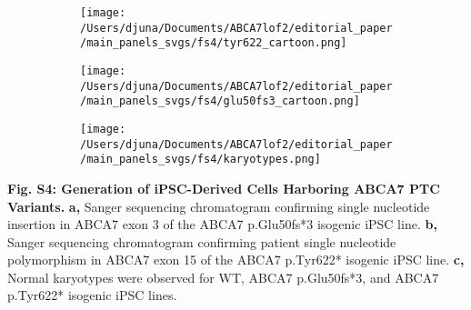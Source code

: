 \documentclass[12pt]{article}
\begin{document}
\begin{figure}[H]
    \begin{subfigure}[t]{0.4\textwidth}
        \caption{}
        \hspace{1.5cm}
        \texttt{[image: /Users/djuna/Documents/ABCA7lof2/editorial\_paper/main\_panels\_svgs/fs4/tyr622\_cartoon.png]}        
    \end{subfigure}  
    \hspace{1.5cm}
    \begin{subfigure}[t]{0.4\textwidth}
        \caption{}
        \texttt{[image: /Users/djuna/Documents/ABCA7lof2/editorial\_paper/main\_panels\_svgs/fs4/glu50fs3\_cartoon.png]}        
    \end{subfigure}  
    \par
    \begin{subfigure}[t]{0.9\textwidth}
        \caption{}
        \hspace{1.5cm}
        \texttt{[image: /Users/djuna/Documents/ABCA7lof2/editorial\_paper/main\_panels\_svgs/fs4/karyotypes.png]}        
    \end{subfigure}  
\end{figure}
\textbf{Fig. S4: Generation of iPSC-Derived Cells Harboring ABCA7 PTC Variants.}
\textbf{a,} Sanger sequencing chromatogram confirming single nucleotide insertion in ABCA7 exon 3 of the ABCA7 p.Glu50fs*3 isogenic iPSC line.
\textbf{b,} Sanger sequencing chromatogram confirming patient single nucleotide polymorphism in ABCA7 exon 15 of the ABCA7 p.Tyr622* isogenic iPSC line. 
\textbf{c,} Normal karyotypes were observed for WT, ABCA7 p.Glu50fs*3, and ABCA7 p.Tyr622* isogenic iPSC lines. 
\end{document}
